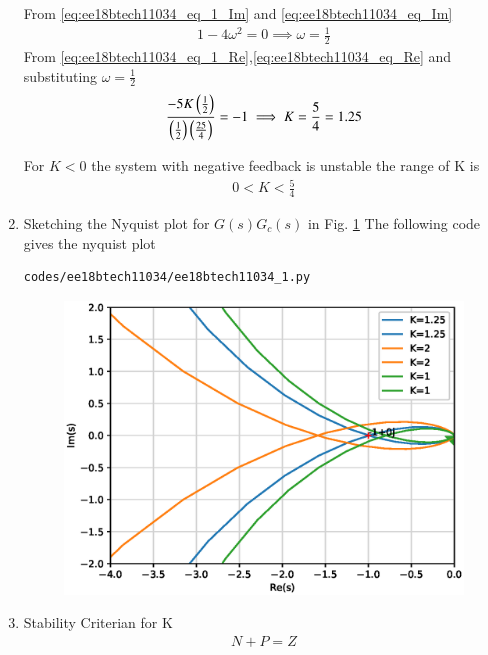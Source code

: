 \begin{enumerate}[label=\thesubsection.\arabic*.,ref=\thesubsection.\theenumi]
From \eqref{eq:ee18btech11034_eq_1_Im} and \eqref{eq:ee18btech11034_eq_Im}
\begin{align}
    1-4\omega^2 = 0
    \implies \omega = \frac{1}{2} 
\end{align}
From  \eqref{eq:ee18btech11034_eq_1_Re},\eqref{eq:ee18btech11034_eq_Re} and substituting $\omega = \frac{1}{2}$
\begin{align}
    \frac{-5K\left(\frac{1}{2}\right)}{\left(\frac{1}{2}\right)\left(\frac{25}{4}\right)} = -1
    \implies K = \frac{5}{4} = 1.25
\end{align}

For $K < 0$ the system with negative feedback is unstable the range of K is 
\begin{align}
    0 < K < \frac{5}{4}
\end{align}
\item Sketching the Nyquist plot for $G(s)G_c(s)$ in Fig. \ref{fig:ee18btech11034_1}
The following code gives the nyquist plot
\begin{lstlisting}
codes/ee18btech11034/ee18btech11034_1.py
\end{lstlisting}

\begin{figure}[!h]
\centering
\includegraphics[width=\columnwidth]{./figs/ee18btech11034/ee18btech11034_1.eps}
\caption{}
\label{fig:ee18btech11034_1}
\end{figure}
\item Stability Criterian for K
\begin{align}
    N + P = Z
    \label{eq:ee18btech11034_Z}
\end{align}
\begin{table}[!ht]
\centering

\caption{}
\label{table:ee18btech11034_table1}
\end{table}


\end{enumerate}
